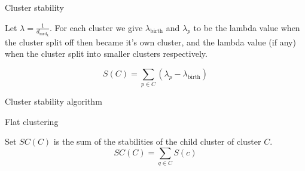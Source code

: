 \documentclass{beamer}
\begin{document}
\begin{frame}{Cluster stability}
\begin{definition}
	Let $\lambda = \frac{1}{d_{\mathrm{mrd}_k}}$. For each cluster we give $\lambda_{\mathrm{birth}}$ and $\lambda_p$ to be the lambda value when the cluster split off then became it’s own cluster, and the lambda value (if any) when the cluster split into smaller clusters respectively.
\end{definition}
$$ S(C) = \sum_{p \in {C}} (\lambda_p - \lambda_{\mathrm{birth}})$$
\end{frame}

\begin{frame}{Cluster stability algorithm}
\begin{algorithm}[H]
	\SetAlgoNoLine
\end{algorithm}
\end{frame}

\begin{frame}{Flat clustering}
\begin{definition}
	Set $SC(C)$ is the sum of the stabilities of the child cluster of cluster $C$.
	$$SC(C) = \sum_{q \in C}S(c)$$
\end{definition}
\end{frame}
\end{document}
